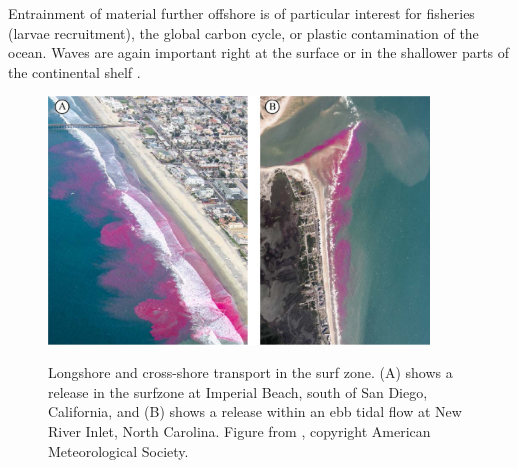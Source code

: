  Entrainment of material further offshore is of particular interest for fisheries (larvae recruitment), the global carbon cycle, or plastic contamination of the ocean. Waves are again important right at the surface or in the shallower parts of the continental shelf \citep{Lentz&al.2008,Onink&al.2019}.

\begin{figure}[htb]
\centerline{\includegraphics[width=0.9\textwidth]{FIGS_CH_NEARSHORE/surf_zone_pink.jpg}}
  \caption{Longshore and cross-shore transport in the surf zone. (A) shows a release in the surfzone at Imperial Beach, south of San Diego, California,
and (B) shows a release within an ebb tidal flow at New River Inlet, North Carolina. Figure from \cite{Clark&al.2014}, copyright American Meteorological Society.}
    {}
\label{fig:surf_pink}
\end{figure}




